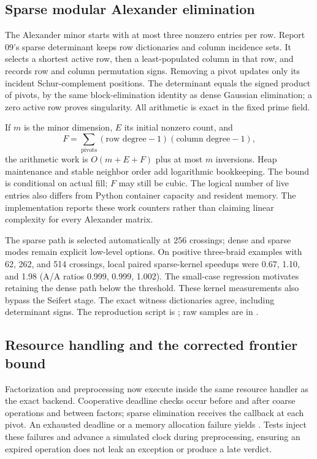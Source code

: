 \subsection{Sparse modular Alexander elimination}
The Alexander minor starts with at most three nonzero entries per row.
Report 09's sparse determinant keeps row dictionaries and column incidence
sets. It selects a shortest active row, then a least-populated column in
that row, and records row and column permutation signs. Removing a pivot
updates only its incident Schur-complement positions. The determinant
equals the signed product of pivots, by the same block-elimination
identity as dense Gaussian elimination; a zero active row proves
singularity. All arithmetic is exact in the fixed prime field.

If $m$ is the minor dimension, $E$ its initial nonzero count, and
\[
 F=\sum_{\text{pivots}}(\text{row degree}-1)(\text{column degree}-1),
\]
the arithmetic work is $O(m+E+F)$ plus at most $m$ inversions. Heap
maintenance and stable neighbor order add logarithmic bookkeeping.
The bound is conditional on actual fill; $F$ may still be cubic. The
logical number of live entries also differs from Python container
capacity and resident memory. The implementation reports these work
counters rather than claiming linear complexity for every Alexander
matrix.

The sparse path is selected automatically at 256 crossings; dense and
sparse modes remain explicit low-level options. On positive three-braid
examples with 62, 262, and 514 crossings, local paired sparse-kernel
speedups were 0.67, 1.10, and 1.98 (A/A ratios 0.999, 0.999, 1.002).
The small-case regression motivates retaining the dense path below the
threshold. These kernel measurements also bypass the Seifert stage.
The exact witness dictionaries agree, including determinant signs.
The reproduction script is ;
raw samples are in .

\subsection{Resource handling and the corrected frontier bound}
Factorization and preprocessing now execute inside the same resource
handler as the exact backend. Cooperative deadline checks occur before
and after coarse operations and between factors; sparse elimination
receives the callback at each pivot. An exhausted deadline or a memory
allocation failure yields . Tests inject these failures
and advance a simulated clock during preprocessing, ensuring an expired
operation does not leak an exception or produce a late verdict.

